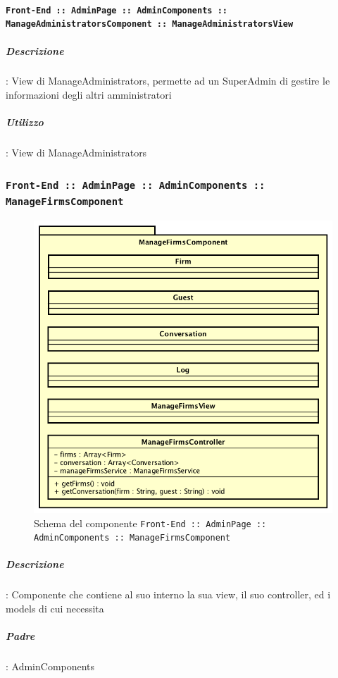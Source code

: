 \documentclass[../DefinizioneDiProdotto_v2.0.0.tex]{subfiles}
\begin{document}
				\paragraph{\texttt{Front-End :: AdminPage :: AdminComponents :: ManageAdministratorsComponent :: ManageAdministratorsView}}
					\subparagraph{Descrizione}: View di ManageAdministrators, permette ad un SuperAdmin di gestire le informazioni degli altri amministratori
					\subparagraph{Utilizzo}: View di ManageAdministrators

	\newpage
	\subsubsection{\texttt{Front-End :: AdminPage :: AdminComponents :: ManageFirmsComponent}}
	\begin{figure}[!h]
		\centering
		\includegraphics[scale=0.6]{Architettura/Front-End/AdminPage/AdminComponents/ManageFirmsComponent.png}
		\caption{Schema del componente \texttt{Front-End :: AdminPage :: AdminComponents :: ManageFirmsComponent}}
	\end{figure}

			\subparagraph{Descrizione}: Componente che contiene al suo interno la sua view, il suo controller, ed i models di cui necessita
			\subparagraph{Padre}: AdminComponents
\end{document}

